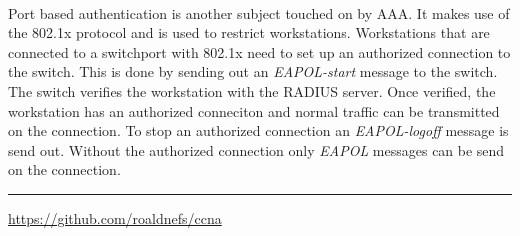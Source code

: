 \documentclass[10pt,landscape]{article}
\begin{document}
\begin{multicols}{3}
\paragraph{}
Port based authentication is another subject touched on by AAA. It makes use of the 802.1x protocol and is used to restrict workstations.
Workstations that are connected to a switchport with 802.1x need to set up an authorized connection to the switch.
This is done by sending out an \textit{EAPOL-start} message to the switch. The switch verifies the workstation with the RADIUS server.
Once verified, the workstation has an authorized conneciton and normal traffic can be transmitted on the connection.
To stop an authorized connection an \textit{EAPOL-logoff} message is send out.
Without the authorized connection only \textit{EAPOL} messages can be send on the connection.


\rule{0.3\linewidth}{0.25pt}
\scriptsize

\href{https://github.com/roaldnefs/ccna}{https://github.com/roaldnefs/ccna}

\end{multicols}
\end{document}

